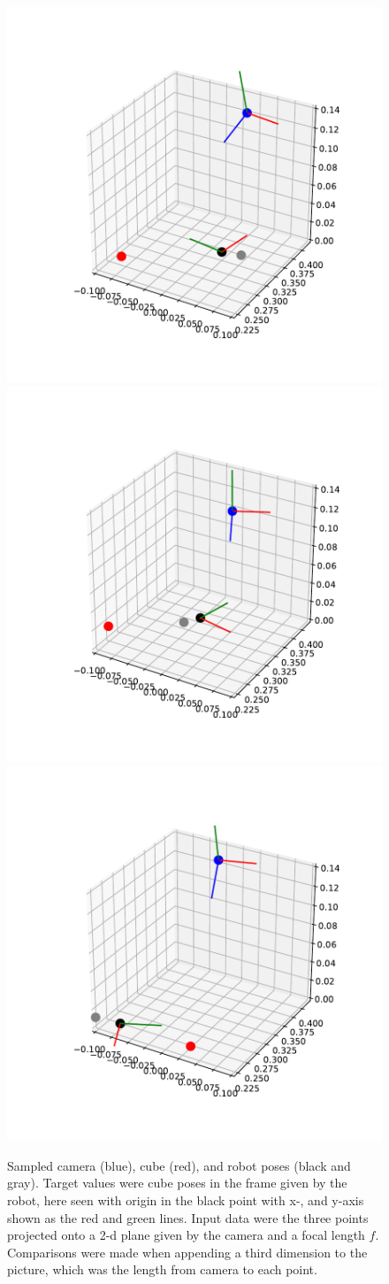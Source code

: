 \begin{figure}[h!]
    \centering
    \includegraphics[width=0.32 \textwidth]{res/pose_sim_setup1.pdf}
    \includegraphics[width=0.32 \textwidth]{res/pose_sim_setup2.pdf}
    \includegraphics[width=0.32 \textwidth]{res/pose_sim_setup3.pdf}

    \caption{Sampled camera (blue), cube (red), and robot poses (black and
    gray). Target values were cube poses in the frame given by the robot, here
    seen with origin in the black point with x-, and y-axis shown as the red
    and green lines. Input data were the three points projected onto a 2-d
    plane given by the camera and a focal length $f$. Comparisons were made
    when appending a third dimension to the picture, which was the length from
    camera to each point.}

    \label{fig:pose-sim-setup}
    
\end{figure}

